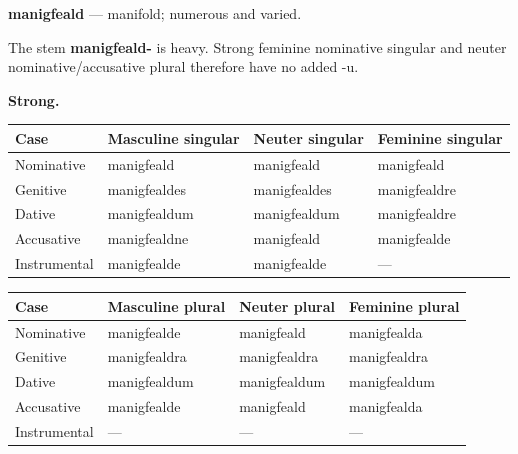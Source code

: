\par\begin{minipage}{\linewidth}\raggedright
\textbf{manigfeald} — manifold; numerous and varied.

The stem \textbf{manigfeald-} is heavy. Strong feminine nominative singular and neuter nominative/\allowbreak{}accusative plural therefore have no added -u.

\textbf{Strong.}

\par\begingroup
\fontsize{10.5}{13.2}\selectfont
\setlength{\LTleft}{0pt}\setlength{\LTright}{\fill}
\noindent
\begin{tabular}{@{}>{\raggedright\arraybackslash}p{22.0mm}>{\raggedright\arraybackslash}p{31.188mm}>{\raggedright\arraybackslash}p{31.188mm}>{\raggedright\arraybackslash}p{31.188mm}@{}}
\toprule
\textbf{Case} & \textbf{Masculine singular} & \textbf{Neuter singular} & \textbf{Feminine singular} \\
\midrule
Nominative & manigfeald & manigfeald & manigfeald \\
Genitive & manigfealdes & manigfealdes & manigfealdre \\
Dative & manigfealdum & manigfealdum & manigfealdre \\
Accusative & manigfealdne & manigfeald & manigfealde \\
Instrumental & manigfealde & manigfealde & — \\
\bottomrule
\end{tabular}
\par\endgroup
\end{minipage}\par
\par\addvspace{5pt}
\par\begingroup
\fontsize{10.5}{13.2}\selectfont
\setlength{\LTleft}{0pt}\setlength{\LTright}{\fill}
\noindent
\begin{tabular}{@{}>{\raggedright\arraybackslash}p{22.0mm}>{\raggedright\arraybackslash}p{31.188mm}>{\raggedright\arraybackslash}p{31.188mm}>{\raggedright\arraybackslash}p{31.188mm}@{}}
\toprule
\textbf{Case} & \textbf{Masculine plural} & \textbf{Neuter plural} & \textbf{Feminine plural} \\
\midrule
Nominative & manigfealde & manigfeald & manigfealda \\
Genitive & manigfealdra & manigfealdra & manigfealdra \\
Dative & manigfealdum & manigfealdum & manigfealdum \\
Accusative & manigfealde & manigfeald & manigfealda \\
Instrumental & — & — & — \\
\bottomrule
\end{tabular}
\par\endgroup

